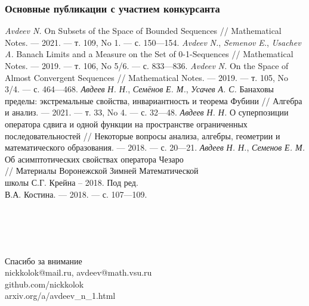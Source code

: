 \documentclass[10pt,pdf,hyperref={unicode},aspectratio=169,color={usenames, dvipsnames}]{beamer}
\theoremstyle{definition}
\begin{document}
\begin{frame}
	\frametitle{Основные публикации с участием конкурсанта}
	\vspace{-1.2em}
	\hfill
	\begin{varwidth}[t]{0.95\linewidth}
	\setlength\itemsep{0pt}
	\begin{thebibliography}{99}
		\setlength{\parskip}{0pt}%
		\setlength{\itemsep}{0pt}
		{}
		\small
			\emph{Avdeev N.} On Subsets of the Space of Bounded Sequences // Mathematical Notes. — 2021. — т. 109, No 1. — с. 150—154.
			\mzm
		{}
		\vspace{-0.5em}
		\small
			\emph{Avdeev} \emph{N.}, \emph{Semenov} \emph{E.}, \emph{Usachev} \emph{A.} Banach Limits and a Measure on the Set of 0-1-Sequences //
			Mathematical Notes. — 2019. — т. 106, No 5/6. — с. 833—836.
			\mzm
		{}
		\vspace{-0.5em}
		\small
			\emph{Avdeev} \emph{N.} On the Space of Almost Convergent Sequences // Mathematical Notes. — 2019. — т. 105, No 3/4. — с. 464—468.
			\mzm
		{}
		\vspace{-0.5em}
		\small
			\emph{Авдеев} \emph{Н. Н.}, \emph{Семёнов} \emph{Е. М.}, \emph{Усачев} \emph{А. С.}
			Банаховы пределы: экстремальные свойства,
			инвариантность и теорема Фубини // Алгебра и анализ. — 2021. — т. 33, No 4. — с. 32—48.
			\vak
		{}
		\vspace{-0.5em}
		\footnotesize
			\emph{Авдеев} \emph{Н. Н.} О суперпозиции оператора сдвига и одной функции на пространстве ограниченных последовательностей //
			Некоторые вопросы анализа, алгебры, геометрии и математического образования. — 2018. — с. 20—21.
			\rinc
		{}
		\vspace{-0.6em}
		\footnotesize
			\emph{Авдеев} \emph{Н. Н.}, \emph{Семенов} \emph{Е. М.}
			Об асимптотических свойствах оператора Чезаро \\// Материалы Воронежской Зимней
			Математической\\школы С.Г. Крейна – 2018.  Под ред.\\В.А. Костина. — 2018. — с. 107—109.
			\rinc
	\end{thebibliography}
	\end{varwidth}
	\vspace{10em}
\end{frame}


\begin{frame}
	{
		\huge\centering
		~\\~\\~\\~\\
		Спасибо за внимание
	}
	~\\
	\vspace{6.28em}
	nickkolok@mail.ru, avdeev@math.vsu.ru
	\\
	github.com/nickkolok
	\\
	arxiv.org/a/avdeev\_n\_1.html
\end{frame}
\end{document}
